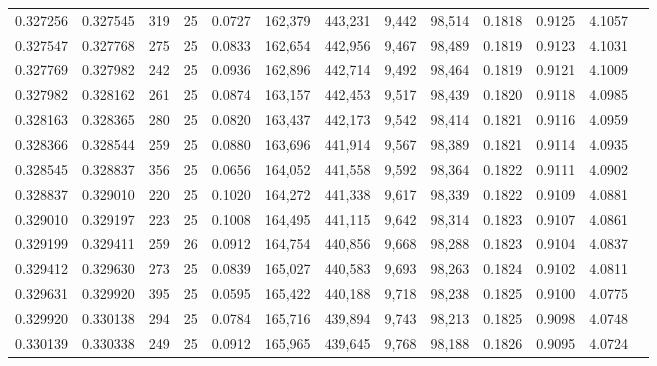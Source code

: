 \begin{tabular}{rrrrrrrrrrrrr}
0.327256 & 0.327545 &   319 &  25 &                                     0.0727 & 162,379 & 443,231 &   9,442 &  98,514 & 0.1818 & 0.9125 & 4.1057 \\
0.327547 & 0.327768 &   275 &  25 &                                     0.0833 & 162,654 & 442,956 &   9,467 &  98,489 & 0.1819 & 0.9123 & 4.1031 \\
0.327769 & 0.327982 &   242 &  25 &                                     0.0936 & 162,896 & 442,714 &   9,492 &  98,464 & 0.1819 & 0.9121 & 4.1009 \\
0.327982 & 0.328162 &   261 &  25 &                                     0.0874 & 163,157 & 442,453 &   9,517 &  98,439 & 0.1820 & 0.9118 & 4.0985 \\
0.328163 & 0.328365 &   280 &  25 &                                     0.0820 & 163,437 & 442,173 &   9,542 &  98,414 & 0.1821 & 0.9116 & 4.0959 \\
0.328366 & 0.328544 &   259 &  25 &                                     0.0880 & 163,696 & 441,914 &   9,567 &  98,389 & 0.1821 & 0.9114 & 4.0935 \\
0.328545 & 0.328837 &   356 &  25 &                                     0.0656 & 164,052 & 441,558 &   9,592 &  98,364 & 0.1822 & 0.9111 & 4.0902 \\
0.328837 & 0.329010 &   220 &  25 &                                     0.1020 & 164,272 & 441,338 &   9,617 &  98,339 & 0.1822 & 0.9109 & 4.0881 \\
0.329010 & 0.329197 &   223 &  25 &                                     0.1008 & 164,495 & 441,115 &   9,642 &  98,314 & 0.1823 & 0.9107 & 4.0861 \\
0.329199 & 0.329411 &   259 &  26 &                                     0.0912 & 164,754 & 440,856 &   9,668 &  98,288 & 0.1823 & 0.9104 & 4.0837 \\
0.329412 & 0.329630 &   273 &  25 &                                     0.0839 & 165,027 & 440,583 &   9,693 &  98,263 & 0.1824 & 0.9102 & 4.0811 \\
0.329631 & 0.329920 &   395 &  25 &                                     0.0595 & 165,422 & 440,188 &   9,718 &  98,238 & 0.1825 & 0.9100 & 4.0775 \\
0.329920 & 0.330138 &   294 &  25 &                                     0.0784 & 165,716 & 439,894 &   9,743 &  98,213 & 0.1825 & 0.9098 & 4.0748 \\
0.330139 & 0.330338 &   249 &  25 &                                     0.0912 & 165,965 & 439,645 &   9,768 &  98,188 & 0.1826 & 0.9095 & 4.0724 \\

\end{tabular}
